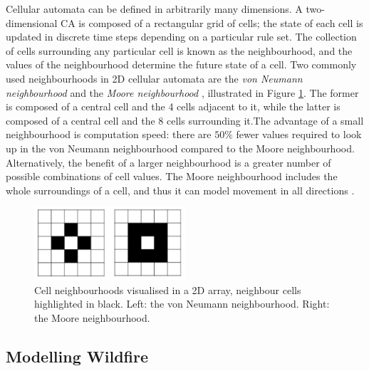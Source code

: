 \noindent Cellular automata can be defined in arbitrarily many dimensions. A two-dimensional CA is composed of a rectangular grid of cells; the state of each cell is updated in discrete time steps depending on a particular rule set. The collection of cells surrounding any particular cell is known as the neighbourhood, and the values of the neighbourhood determine the future state of a cell. Two commonly used  neighbourhoods in 2D cellular automata are the \textit{von Neumann neighbourhood} \cite{wolfram1986theory} and the \textit{Moore neighbourhood} \cite{101917}, illustrated in Figure \ref{hoods}. The former is composed of a central cell and the 4 cells adjacent to it, while the latter is composed of a central cell and the 8 cells surrounding it.\newline \indent The advantage of a small neighbourhood is computation speed: there are $50\%$ fewer values required to look up in the von Neumann neighbourhood compared to the Moore neighbourhood. Alternatively, the benefit of a larger neighbourhood is a greater number of possible combinations of cell values. The Moore neighbourhood includes the whole surroundings of a cell, and thus it can model movement in all directions \cite{Quartieri_2010}.

\begin{figure}[h!]
\begin{center}
\includegraphics[width=0.5\textwidth]{Figures/von.png}\caption{Cell neighbourhoods visualised in a 2D array, neighbour cells highlighted in black. Left: the von Neumann neighbourhood. Right: the Moore neighbourhood.}\label{hoods}
\end{center}
\end{figure} 

\subsection{Modelling Wildfire}\label{Modelling_Wildfire}

